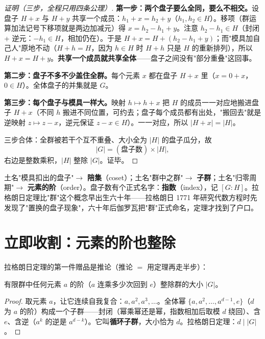\begin{proof}[证明（三步，全程只用四条公理）]
\textbf{第一步：两个盘子要么全同，要么不相交。}设盘子 $H+x$ 与 $H+y$ 共享一个成员：$h_1 + x = h_2 + y$（$h_1, h_2 \in H$）。移项（群运算加法记号下移项就是两边加减元）得 $x = h_2 - h_1 + y$。注意 $h_2 - h_1 \in H$（封闭 + 逆元：$-h_1 \in H$，相加仍在）。于是 $H + x = H + (h_2 - h_1 + y)$；而"模具加自己人"原地不动（$H + h = H$，因为 $h\in H$ 时 $H+h$ 只是 $H$ 的重新排列），所以 $H + x = H + y$。\textbf{共享一个成员就共享全体}——盘子之间没有"部分重叠"这回事。

\textbf{第二步：盘子不多不少盖住全群。}每个元素 $x$ 都在盘子 $H+x$ 里（$x = 0 + x$，$0 \in H$）。全体盘子的并集就是 $G$。

\textbf{第三步：每个盘子与模具一样大。}映射 $h \mapsto h + x$ 把 $H$ 的成员一一对应地搬进盘子 $H+x$（不同 $h$ 搬进不同位置，可约去；盘子每个成员都有出处，"搬回去"就是逆映射 $z \mapsto z - x$，逆元保证 $z - x \in H$）。一一对应，所以 $|H+x| = |H|$。

三步合体：全群被若干个互不重叠、大小全为 $|H|$ 的盘子瓜分，故
\[
|G| = (\text{盘子数}) \times |H| ,
\]
右边是整数乘积，$|H|$ 整除 $|G|$。证毕。
\end{proof}

\begin{cidian}
土名"模具扣出的盘子"$\to$ \textbf{陪集}（coset）；土名"群中之群"$\to$ \textbf{子群}；土名"归零周期"$\to$ \textbf{元素的阶}（order）。盘子数有个正式名字：\textbf{指数}（index），记 $[G:H]$。拉格朗日定理比"群"这个概念早出生六十年——拉格朗日 1771 年研究代数方程时先发现了"置换的盘子现象"，六十年后伽罗瓦把"群"正式命名，定理才找到了户口。
\end{cidian}

\section{立即收割：元素的阶也整除}

拉格朗日定理的第一件赠品是推论（推论 $=$ 用定理再走半步）：

\begin{tuilun}[阶整除群阶]
有限群中任何元素 $a$ 的阶（$a$ 连乘多少次回到 $e$）整除群的大小 $|G|$。
\end{tuilun}
\begin{proof}
取元素 $a$，让它连续自我复合：$a, a^2, a^3, \dots$。全体幂 $\{a, a^2, \dots, a^{d-1}, e\}$（$d$ 为 $a$ 的阶）构成一个子群——封闭（幂乘幂还是幂，指数相加后取模 $d$ 绕回）、含 $e$、含逆（$a^k$ 的逆是 $a^{d-k}$）。它叫\textbf{循环子群}，大小恰为 $d$。拉格朗日定理：$d \mid |G|$。
\end{proof}

